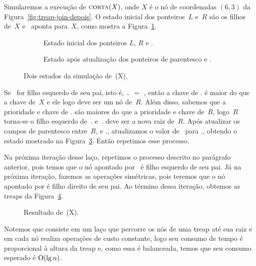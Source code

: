 Simularemos a execução de $\text{\scshape corta}(X)$, onde $X$ é o nó de coordenadas $(6,3)$ da Figura~\ref{fig:treap-join-depois}.
O estado inicial dos ponteiros~$L$ e~$R$ são os filhos de~$X$ e~ aponta para~$X$, como mostra a Figura~\ref{fig:treap-split-1}.

\begin{figure}[htb]
\begin{subfigure}{0.35\textwidth}
\scalebox{.76}{

	}
\caption{Estado inicial dos ponteiros $L$, $R$ e .}
\label{fig:treap-split-1}
\end{subfigure}
\hspace{1cm}
\begin{subfigure}{0.35\textwidth}
\scalebox{.76}{

	}
\caption{Estado após atualização dos ponteiros de parentesco e .}
\label{fig:treap-split-2}
\end{subfigure}
\caption{Dois estados da simulação de~\treapSplit(X).}
\end{figure}
Se~ for filho esquerdo de seu pai, isto é, .. $=$ , então a chave de . é maior do que a chave de~$X$ e ele logo deve ser um nó de~$R$.
Além disso, sabemos que a prioridade e chave de . são maiores do que a prioridade e chave de~$R$,
logo~$R$ torna-se o filho esquerdo de~. e~. deve ser a nova raiz de~$R$. 
Após atualizar os campos de parentesco entre~$R$,  e ., atualizamos o valor de~ para ., obtendo o estado mostrado na Figura~\ref{fig:treap-split-2}.
Então repetimos esse processo. 


Na próxima iteração desse laço, repetimos o processo descrito no parágrafo anterior, pois temos que o nó apontado por~ é filho esquerdo de seu pai.
Já na próxima iteração, fazemos as operações simétricas, pois teremos que o nó apontado por  é filho direito de seu pai.
Ao término dessa iteração, obtemos as treaps da Figura~\ref{fig:treap-split-final}.

\begin{figure}[htb]
\centering
\scalebox{.7}{

}
\caption{Resultado de~\treapSplit(X).}
\label{fig:treap-split-final}
\end{figure}

Notemos que \treapSplit{} consiste em um laço que percorre os nós de uma treap até sua raiz e em cada nó realiza operações de custo constante, logo seu consumo de tempo é proporcional à altura da treap e, como essa é balanceada, temos que seu consumo esperado é $\mathrm{O}(\lg n)$.

